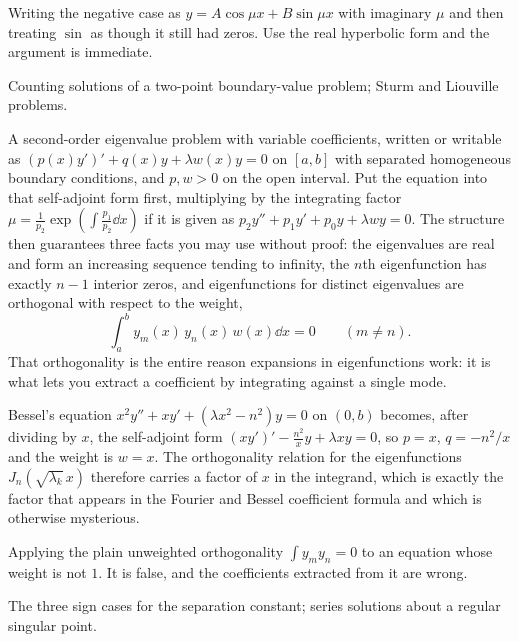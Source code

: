 \begin{trap}
Writing the negative case as $y=A\cos\mu x+B\sin\mu x$ with imaginary $\mu$ and then treating $\sin$ as though it still had zeros. Use the real hyperbolic form and the argument is immediate.
\end{trap}

\begin{seealsob}Counting solutions of a two-point boundary-value problem; Sturm and Liouville problems.\end{seealsob}

\cue A second-order eigenvalue problem with variable coefficients, written or writable as $\left(p(x)y'\right)'+q(x)y+\lambda w(x)y=0$ on $[a,b]$ with separated homogeneous boundary conditions, and $p,w>0$ on the open interval.
\method Put the equation into that self-adjoint form first, multiplying by the integrating factor $\mu=\frac{1}{p_{2}}\exp\left(\int \frac{p_{1}}{p_{2}}\dd x\right)$ if it is given as $p_{2}y''+p_{1}y'+p_{0}y+\lambda wy=0$. The structure then guarantees three facts you may use without proof: the eigenvalues are real and form an increasing sequence tending to infinity, the $n$th eigenfunction has exactly $n-1$ interior zeros, and eigenfunctions for distinct eigenvalues are orthogonal with respect to the weight,
\[
\int_{a}^{b} y_{m}(x)\,y_{n}(x)\,w(x)\dd x=0\qquad (m\neq n).
\]
That orthogonality is the entire reason expansions in eigenfunctions work: it is what lets you extract a coefficient by integrating against a single mode.

\begin{worked}
Bessel's equation $x^{2}y''+xy'+(\lambda x^{2}-n^{2})y=0$ on $(0,b)$ becomes, after dividing by $x$, the self-adjoint form $\left(xy'\right)'-\frac{n^{2}}{x}y+\lambda xy=0$, so $p=x$, $q=-n^{2}/x$ and the weight is $w=x$. The orthogonality relation for the eigenfunctions $J_{n}(\sqrt{\lambda_{k}}\,x)$ therefore carries a factor of $x$ in the integrand, which is exactly the factor that appears in the Fourier and Bessel coefficient formula and which is otherwise mysterious.
\end{worked}

\begin{trap}
Applying the plain unweighted orthogonality $\int y_{m}y_{n}=0$ to an equation whose weight is not $1$. It is false, and the coefficients extracted from it are wrong.
\end{trap}

\begin{seealsob}The three sign cases for the separation constant; series solutions about a regular singular point.\end{seealsob}

